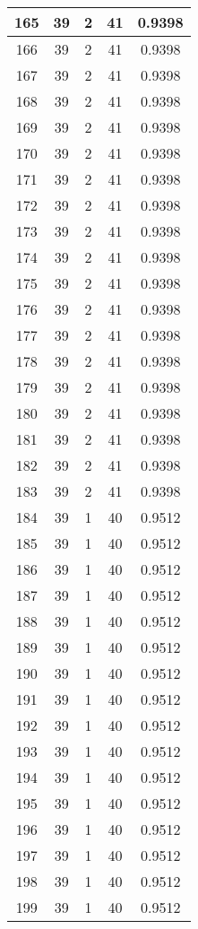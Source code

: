 \documentclass[letterpaper, 12pt]{article}
\begin{document}
\begin{longtable}{|c|c|c|c|c|}
\hline
165 & 39 & 2 & 41 & 0.9398 \\
\hline
166 & 39 & 2 & 41 & 0.9398 \\
\hline
167 & 39 & 2 & 41 & 0.9398 \\
\hline
168 & 39 & 2 & 41 & 0.9398 \\
\hline
169 & 39 & 2 & 41 & 0.9398 \\
\hline
170 & 39 & 2 & 41 & 0.9398 \\
\hline
171 & 39 & 2 & 41 & 0.9398 \\
\hline
172 & 39 & 2 & 41 & 0.9398 \\
\hline
173 & 39 & 2 & 41 & 0.9398 \\
\hline
174 & 39 & 2 & 41 & 0.9398 \\
\hline
175 & 39 & 2 & 41 & 0.9398 \\
\hline
176 & 39 & 2 & 41 & 0.9398 \\
\hline
177 & 39 & 2 & 41 & 0.9398 \\
\hline
178 & 39 & 2 & 41 & 0.9398 \\
\hline
179 & 39 & 2 & 41 & 0.9398 \\
\hline
180 & 39 & 2 & 41 & 0.9398 \\
\hline
181 & 39 & 2 & 41 & 0.9398 \\
\hline
182 & 39 & 2 & 41 & 0.9398 \\
\hline
183 & 39 & 2 & 41 & 0.9398 \\
\hline
184 & 39 & 1 & 40 & 0.9512 \\
\hline
185 & 39 & 1 & 40 & 0.9512 \\
\hline
186 & 39 & 1 & 40 & 0.9512 \\
\hline
187 & 39 & 1 & 40 & 0.9512 \\
\hline
188 & 39 & 1 & 40 & 0.9512 \\
\hline
189 & 39 & 1 & 40 & 0.9512 \\
\hline
190 & 39 & 1 & 40 & 0.9512 \\
\hline
191 & 39 & 1 & 40 & 0.9512 \\
\hline
192 & 39 & 1 & 40 & 0.9512 \\
\hline
193 & 39 & 1 & 40 & 0.9512 \\
\hline
194 & 39 & 1 & 40 & 0.9512 \\
\hline
195 & 39 & 1 & 40 & 0.9512 \\
\hline
196 & 39 & 1 & 40 & 0.9512 \\
\hline
197 & 39 & 1 & 40 & 0.9512 \\
\hline
198 & 39 & 1 & 40 & 0.9512 \\
\hline
199 & 39 & 1 & 40 & 0.9512 \\
\hline
\end{longtable}
\end{document}
